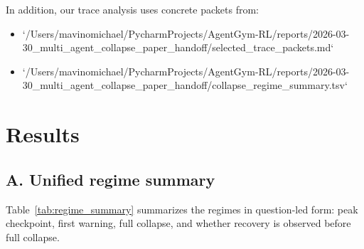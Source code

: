 \documentclass{ieeeaccess}
\begin{document}
In addition, our trace analysis uses concrete packets from:
\begin{itemize}
\item `/Users/mavinomichael/PycharmProjects/AgentGym-RL/reports/2026-03-30_multi_agent_collapse_paper_handoff/selected_trace_packets.md`
\item `/Users/mavinomichael/PycharmProjects/AgentGym-RL/reports/2026-03-30_multi_agent_collapse_paper_handoff/collapse_regime_summary.tsv`
\end{itemize}

\section{Results}
\subsection{A. Unified regime summary}
Table~\ref{tab:regime_summary} summarizes the regimes in question-led form: peak checkpoint, first warning, full collapse, and whether recovery is observed before full collapse.

\begin{table}[!t]
\centering
\caption{Unified regime summary with collapse timing and recovery. WebArena is included as cross-environment evidence rather than a directly comparable success benchmark.}
\label{tab:regime_summary}
\end{table}
\end{document}
